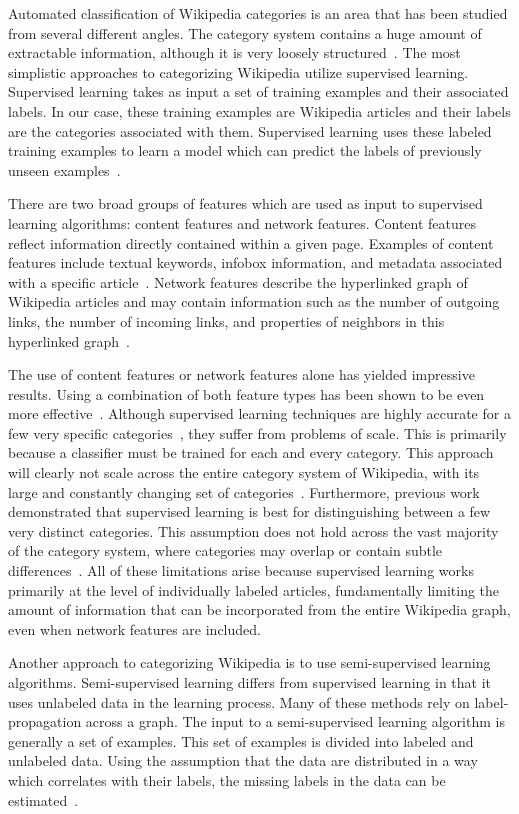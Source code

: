 \documentclass{sig-alternate}
\begin{document}
Automated classification of Wikipedia categories is an area that has been studied from several different angles. The category system contains a huge amount of extractable information, although it is very loosely structured~\cite{Ponzetto,Strube}. The most simplistic approaches to categorizing Wikipedia utilize supervised learning. Supervised learning takes as input a set of training examples and their associated labels. In our case, these training examples are Wikipedia articles and their labels are the categories associated with them. Supervised learning uses these labeled training examples to learn a model which can predict the labels of previously unseen examples~\cite{Szymanski}.

There are two broad groups of features which are used as input to supervised learning algorithms: content features and network features. Content features reflect information directly contained within a given page. Examples of content features include textual keywords, infobox information, and metadata associated with a specific article~\cite{Tkachenko}. Network features describe the hyperlinked graph of Wikipedia articles and may contain information such as the number of outgoing links, the number of incoming links, and properties of neighbors in this hyperlinked graph~\cite{Getoor}.

The use of content features or network features alone has yielded impressive results. Using a combination of both feature types has been shown to be even more effective~\cite{Gantner}. Although supervised learning techniques are highly accurate for a few very specific categories~\cite{Gantner, Fu, Szymanski, Tkachenko}, they suffer from problems of scale. This is primarily because a classifier must be trained for each and every category. This approach will clearly not scale across the entire category system of Wikipedia, with its large and constantly changing set of categories~\cite{Fu}. Furthermore, previous work demonstrated that supervised learning is best for distinguishing between a few very distinct categories. This assumption does not hold across the vast majority of the category system, where categories may overlap or contain subtle differences~\cite{Thornton}. All of these limitations arise because supervised learning works primarily at the level of individually labeled articles, fundamentally limiting the amount of information that can be incorporated from the entire Wikipedia graph, even when network features are included.

Another approach to categorizing Wikipedia is to use semi-supervised learning algorithms. Semi-supervised learning differs from supervised learning in that it uses unlabeled data in the learning process. Many of these methods rely on label-propagation across a graph. The input to a semi-supervised learning algorithm is generally a set of examples. This set of examples is divided into labeled and unlabeled data. Using the assumption that the data are distributed in a way which correlates with their labels, the missing labels in the data can be estimated~\cite{Carlson}.
\end{document}
